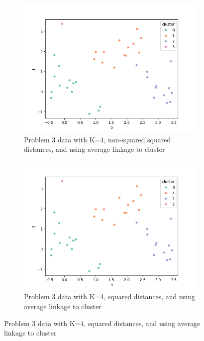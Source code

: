 \documentclass[12pt]{article}
\begin{document}
\begin{figure}
    \begin{subfigure}{0.5\textwidth}
        \centering
        \includegraphics[width=\linewidth]{../plots/average_linkage_4.png}
        \caption{Problem 3 data with K=4, non-squared squared distances, and using average linkage to cluster}
        \label{fig:average_4}
    \end{subfigure}
    \begin{subfigure}{0.5\textwidth}
        \centering
        \includegraphics[width=\linewidth]{../plots/average_squared_4.png}
        \caption{Problem 3 data with K=4, squared distances, and using average linkage to cluster}
        \label{fig:average_squared_4}
    \end{subfigure}

\end{figure}
\end{document}
